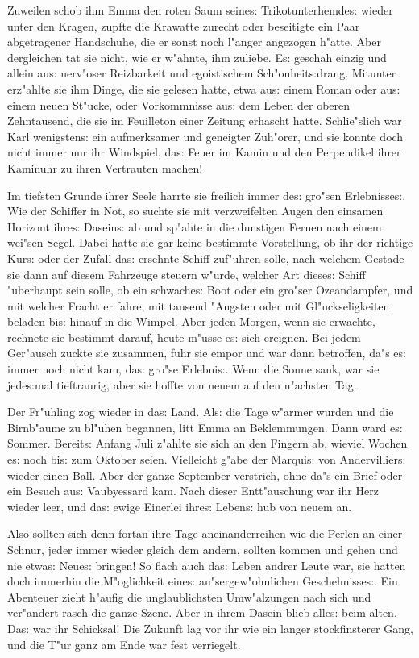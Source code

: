 \documentclass[oneside,12pt]{book}
\newcommand{\s}{s:}%
\begin{document}
Zuweilen schob ihm Emma den roten Saum seine{\s}
Trikotunterhemde{\s} wieder unter den Kragen, zupfte die Krawatte
zurecht oder beseitigte ein Paar abgetragener Handschuhe, die er
sonst noch l"anger angezogen h"atte. Aber dergleichen tat sie
nicht, wie er w"ahnte, ihm zuliebe. E{\s} geschah einzig und
allein au{\s} nerv"oser Reizbarkeit und egoistischem
Sch"onheit{\s}drang. Mitunter erz"ahlte sie ihm Dinge, die sie
gelesen hatte, etwa au{\s} einem Roman oder au{\s} einem neuen
St"ucke, oder Vorkommnisse au{\s} dem Leben der oberen
Zehntausend, die sie im Feuilleton einer Zeitung erhascht hatte.
Schlie"slich war Karl wenigsten{\s} ein aufmerksamer und geneigter
Zuh"orer, und sie konnte doch nicht immer nur ihr Windspiel,
da{\s} Feuer im Kamin und den Perpendikel ihrer Kaminuhr zu ihren
Vertrauten machen!

Im tiefsten Grunde ihrer Seele harrte sie freilich immer de{\s}
gro"sen Erlebnisse{\s}. Wie der Schiffer in Not, so suchte sie mit
verzweifelten Augen den einsamen Horizont ihre{\s} Dasein{\s} ab
und sp"ahte in die dunstigen Fernen nach einem wei"sen Segel.
Dabei hatte sie gar keine bestimmte Vorstellung, ob ihr der
richtige Kur{\s} oder der Zufall da{\s} ersehnte Schiff zuf"uhren
solle, nach welchem Gestade sie dann auf diesem Fahrzeuge steuern
w"urde, welcher Art diese{\s} Schiff "uberhaupt sein solle, ob ein
schwache{\s} Boot oder ein gro"ser Ozeandampfer, und mit welcher
Fracht er fahre, mit tausend "Angsten oder mit Gl"uckseligkeiten
beladen bi{\s} hinauf in die Wimpel. Aber jeden Morgen, wenn sie
erwachte, rechnete sie bestimmt darauf, heute m"usse e{\s} sich
ereignen. Bei jedem Ger"ausch zuckte sie zusammen, fuhr sie empor
und war dann betroffen, da"s e{\s} immer noch nicht kam, da{\s}
gro"se Erlebni{\s}. Wenn die Sonne sank, war sie jede{\s}mal
tieftraurig, aber sie hoffte von neuem auf den n"achsten Tag.

Der Fr"uhling zog wieder in da{\s} Land. Al{\s} die Tage w"armer
wurden und die Birnb"aume zu bl"uhen begannen, litt Emma an
Beklemmungen. Dann ward e{\s} Sommer. Bereit{\s} Anfang Juli
z"ahlte sie sich an den Fingern ab, wieviel Wochen e{\s} noch
bi{\s} zum Oktober seien. Vielleicht g"abe der Marqui{\s} von
Andervillier{\s} wieder einen Ball. Aber der ganze September
verstrich, ohne da"s ein Brief oder ein Besuch au{\s} Vaubyessard
kam. Nach dieser Entt"auschung war ihr Herz wieder leer, und
da{\s} ewige Einerlei ihre{\s} Leben{\s} hub von neuem an.

Also sollten sich denn fortan ihre Tage aneinanderreihen wie die
Perlen an einer Schnur, jeder immer wieder gleich dem andern,
sollten kommen und gehen und nie etwa{\s} Neue{\s} bringen! So
flach auch da{\s} Leben andrer Leute war, sie hatten doch immerhin
die M"oglichkeit eine{\s} au"sergew"ohnlichen Geschehnisse{\s}.
Ein Abenteuer zieht h"aufig die unglaublichsten Umw"alzungen nach
sich und ver"andert rasch die ganze Szene. Aber in ihrem Dasein
blieb alle{\s} beim alten. Da{\s} war ihr Schicksal! Die Zukunft
lag vor ihr wie ein langer stockfinsterer Gang, und die T"ur ganz
am Ende war fest verriegelt.
\end{document}
